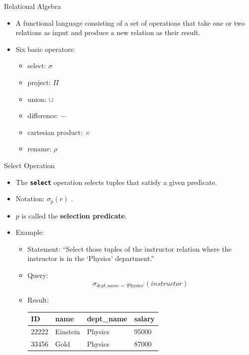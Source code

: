 \documentclass{beamer}
\begin{document}
\begin{frame}{Relational Algebra}
    \begin{itemize}
        \item A functional language consisting of a set of operations that take one or two relations as input and produce a new relation as their result.
        \item Six basic operators:
        \begin{itemize}
            \item select: $\sigma$
            \item project: $\Pi$
            \item union: $\cup$
            \item difference: $-$
            \item cartesian product: $\times$
            \item rename: $\rho$
        \end{itemize}
    \end{itemize}
\end{frame}

\begin{frame}{Select Operation}
    \begin{itemize}
        \item The \textbf{\texttt{select}} operation selects tuples that satisfy a given predicate.
        \item Notation: { \LARGE $\sigma_p (r)$ }.
        \item $p$ is called the \textbf{selection predicate}.
        \item Example: 
        \begin{itemize}
            \item Statement: ``Select those tuples of the instructor relation where the instructor is in the `Physics' department.''
            \item Query: 
                {\large
                $$
                    \sigma_{dept\_name = \text{`Physics'}} (instructor)
                $$}
            \item Result:\\
                \vspace{2mm}
                \centering
                \begin{tabular}{| l | l | l | l |}
                \hline
                 ID & name & dept\_name & salary \\
                 \hline
                 22222 & Einstein & Physics & 95000 \\
                 \hline
                 33456 & Gold & Physics & 87000 \\
                 \hline
                \end{tabular}
        \end{itemize}
    \end{itemize}
\end{frame}
\end{document}
